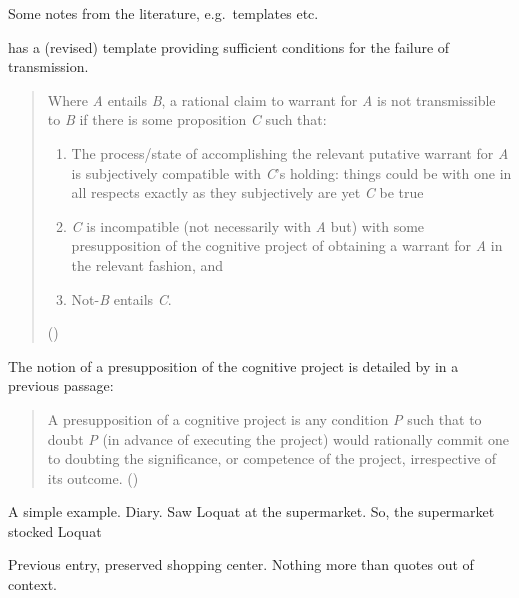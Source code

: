 \documentclass[10pt]{article}
\begin{document}
\begin{note}
  Some notes from the literature, e.g.\ templates etc.\

  \textcite{Wright:2011wn} has a (revised) template providing sufficient conditions for the failure of transmission.

  \begin{quote}
    Where \emph{A} entails \emph{B}, a rational claim to warrant for \emph{A} is not transmissible to \emph{B} if there is some proposition \emph{C} such that:

    \begin{enumerate}[label=(\roman*), ref=(\roman*)]
    \item\label{Wright:revised-template:1} The process/state of accomplishing the relevant putative warrant for \emph{A} is subjectively compatible with \emph{C}'s holding: things could be with one in all respects exactly as they subjectively are yet \emph{C} be true
    \item\label{Wright:revised-template:2} \emph{C} is incompatible (not necessarily with \emph{A} but) with some presupposition of the cognitive project of obtaining a warrant for \emph{A} in the relevant fashion, and
    \item\label{Wright:revised-template:3} Not-\emph{B} entails \emph{C}.
    \end{enumerate}
    \mbox{}\hfill\mbox{(\citeyear[93--94]{Wright:2011wn})}
  \end{quote}

  The notion of a presupposition of the cognitive project is detailed by \citeauthor{Wright:2011wn} in a previous passage:
  \begin{quote}
    A presupposition of a cognitive project is any condition \emph{P} such that to doubt \emph{P} (in advance of executing the project) would rationally commit one to doubting the significance, or competence of the project, irrespective of its outcome.\nolinebreak
    \mbox{}\hfill\mbox{(\citeyear[92]{Wright:2011wn})}
  \end{quote}

  A simple example.
  Diary.
  Saw Loquat at the supermarket.
  So, the supermarket stocked Loquat

  Previous entry, preserved shopping center.
  Nothing more than quotes out of context.
\end{note}
\end{document}
